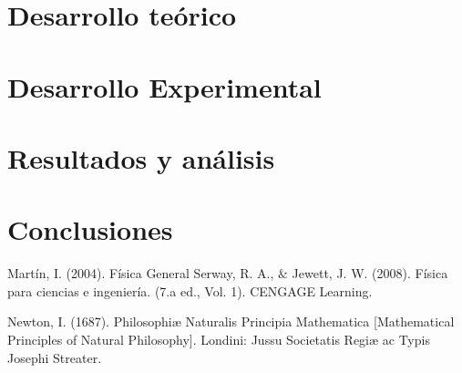 \documentclass{article}
\begin{document}
\begin{multicols}{2}

\section{Desarrollo teórico}\label{Desarrollo Teorico}                              	%

\section{Desarrollo Experimental}\label{Desarrollo experimental}				%

\end{multicols}
\section{Resultados y análisis}\label{Resultados}			%

\section{Conclusiones}\label{Conclusiones}				%

\begin{thebibliography}{9}						%
		Martín, I. (2004). Física General
		Serway, R. A., $\&$ Jewett, J. W. (2008). Física para ciencias e ingeniería. (7.a
ed., Vol. 1). CENGAGE Learning.

	Newton, I. (1687). Philosophiæ Naturalis Principia Mathematica [Mathematical Principles of Natural Philosophy]. Londini: Jussu Societatis Regiæ ac Typis Josephi Streater.
\end{thebibliography}
\end{document}
